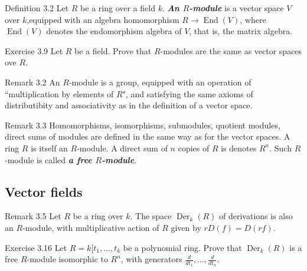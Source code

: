 \begin{thing3}{Definition 3.2}\label{def:3.2}\leavevmode
Let \(R\) be a ring over a field \(k\). \textit{\textbf{An \(R\)-module}} is a vector space \(V\) over \(k\),equipped with an algebra homomorphism \(R \to \operatorname{End}(V)\), where \(\operatorname{End}(V)\) denotes the endomorphism algebra of \(V\), that is, the matrix algebra.
\end{thing3}

\begin{thing4}{Exercise 3.9}\label{exer:3.9}\leavevmode
Let \(R\) be a field. Prove that \(R\)-modules are the same as vector spaces ove \(R\).
\end{thing4}

\begin{thing5}{Remark 3.2}\label{rk:3.2}\leavevmode
An \(R\)-module is a group, equipped with an operation of  ``multiplication by elements of \(R\)", and satisfying the same axioms of distributibity and associativity as in the definition of a vector space.
\end{thing5}

\begin{thing5}{Remark 3.3}\label{rk:3.3}\leavevmode
Homomorphisms, isomorphisms, submodules, quotient modules, direct sums of modules are defined in the same way as for the vector spaces. A ring \(R\) is itself an \(R\)-module. A direct sum of $n$ copies of \(R\) is denotes \(R^n\). Such \(R\)-module is called \textit{\textbf{a free \(R\)-module}}.
\end{thing5}

\subsection{Vector fields}

\begin{thing5}{Remark 3.5}\label{rk:3.5}\leavevmode
Let \(R\) be a ring over \(k\). The space \(\operatorname{Der}_k(R)\) of derivations is also an \(R\)-module, with multiplicative action of \(R\) given by \(rD(f)=D(rf)\).
\end{thing5}

\begin{thing4}{Exercise 3.16}\label{exer:3.16}\leavevmode
Let \(R=k[t_1,\ldots,t_k\) be a polynomial ring. Prove that \(\operatorname{Der}_k(R)\) is a free \(R\)-module isomorphic to \(R^n\), with generators \(\frac{d}{dt_1},\ldots,\frac{d}{dt_n}\).
\end{thing4}

